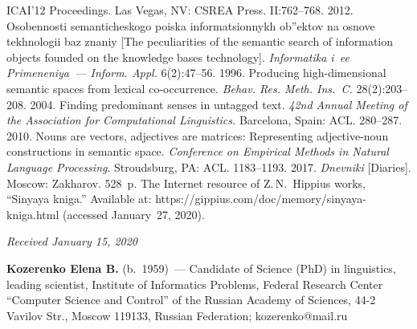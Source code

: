 \begin{multicols}{2}
{{\begin{thebibliography}{99}
{ICAI'12 Proceedings}. Las Vegas, NV: CSREA Press. II:762--768.
 2012. Oso\-ben\-no\-sti semanticheskogo poiska 
informatsionnykh ob''ektov na osnove tekhnologii baz znaniy [The peculiarities of the semantic 
search of information objects founded on the knowledge bases technology]. \textit{Informatika 
i~ee Primeneniya~--- Inform. Appl.} 6(2):47--56.
 1996. Producing high-dimensional semantic spaces from 
lexical co-occurrence. \textit{Behav. Res. Meth. Ins.~C.} 
28(2):203--208.
 2004. Finding predominant senses 
in untagged text. \textit{42nd Annual Meeting of the Association for Computational Linguistics.} 
Barcelona, Spain: ACL. 280--287.
 2010. Nouns are vectors, adjectives are matrices: 
Representing adjective-noun constructions in semantic space. \textit{Conference on 
Empirical Methods in Natural Language Processing}. Stroudsburg, PA: ACL. 1183--1193.
 2017. \textit{Dnevniki} [Diaries]. Moscow: Zakharov. 528~p. 
The Internet resource of Z.\,N.~Hippius works, ``Sinyaya kniga.''
 Available at: {\sf 
https://gippius.com/doc/memory/\linebreak sinyaya-kniga.html} (accessed January~27, 2020).

\end{thebibliography}

 }
 }

\end{multicols}


\hfill{\small\textit{Received January 15, 2020}}


\vspace*{-9pt}

\Contr


\noindent
\textbf{Kozerenko Elena B.} (b.\ 1959)~---  Candidate of Science (PhD) in linguistics, leading 
scientist, Institute of Informatics Problems, Federal Research Center 
``Computer Science and 
Control'' of the Russian Academy of Sciences, 44-2 Vavilov Str., Moscow 119133, Russian 
Federation; \mbox{kozerenko@mail.ru}


\pagebreak

